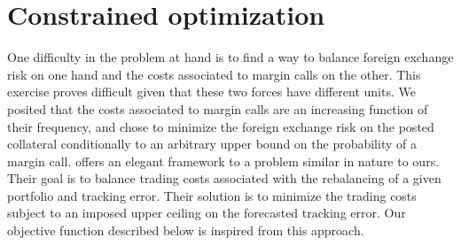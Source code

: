 \section{Constrained optimization}
\label{optimisation}
One difficulty in the problem at hand is to find a way to balance foreign exchange risk on
one hand and the costs associated to margin calls on the other. This exercise proves difficult
given that these two forces have different units. We posited that the costs associated to
margin calls are an increasing function of their frequency, and chose to minimize the foreign exchange
risk on the posted collateral conditionally to an arbitrary upper bound on the probability
of a margin call. \cite{chanramkumar11} offers an elegant framework
to a problem similar in nature to ours. Their goal is to balance trading costs associated
with the rebalancing of a given portfolio and tracking error. Their solution is to
minimize the trading costs subject to an imposed upper ceiling on the forecasted
tracking error. Our objective function described below is inspired from this approach.

